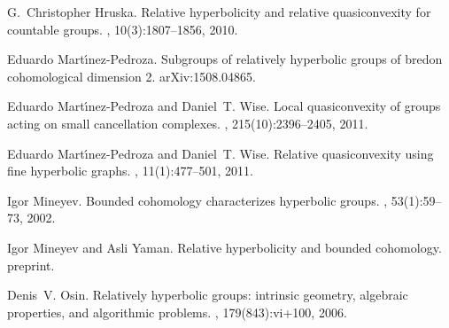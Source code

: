 \begin{thebibliography}{10}
G.~Christopher Hruska.
\newblock Relative hyperbolicity and relative quasiconvexity for countable
  groups.
, 10(3):1807--1856, 2010.

Eduardo Mart{\'{\i}}nez-Pedroza.
\newblock Subgroups of relatively hyperbolic groups of bredon cohomological
  dimension 2.
\newblock arXiv:1508.04865.

Eduardo Mart{\'{\i}}nez-Pedroza and Daniel~T. Wise.
\newblock Local quasiconvexity of groups acting on small cancellation
  complexes.
, 215(10):2396--2405, 2011.

Eduardo Mart{\'{\i}}nez-Pedroza and Daniel~T. Wise.
\newblock Relative quasiconvexity using fine hyperbolic graphs.
, 11(1):477--501, 2011.

Igor Mineyev.
\newblock Bounded cohomology characterizes hyperbolic groups.
, 53(1):59--73, 2002.

Igor Mineyev and Asli Yaman.
\newblock Relative hyperbolicity and bounded cohomology.
\newblock preprint.

Denis~V. Osin.
\newblock Relatively hyperbolic groups: intrinsic geometry, algebraic
  properties, and algorithmic problems.
, 179(843):vi+100, 2006.

\end{thebibliography}











